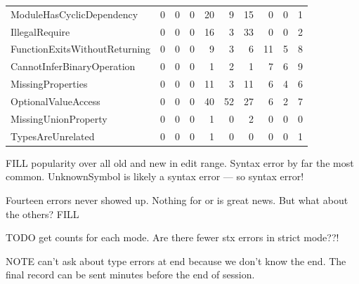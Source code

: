 \documentclass[english,submission,cleveref]{programming}
\begin{document}
\begin{table}[t]
\begin{tabular}{lr@{~}r@{~}rr@{~}r@{~}rr@{~}r@{~}r}
      ModuleHasCyclicDependency & {0} & {0} & {0} & {20} & {9} & {15} & {0} & {0} & {1} \\
      IllegalRequire & {0} & {0} & {0} & {16} & {3} & {33} & {0} & {0} & {2} \\
      FunctionExitsWithoutReturning & {0} & {0} & {0} & {9} & {3} & {6} & {11} & {5} & {8} \\
      CannotInferBinaryOperation & {0} & {0} & {0} & {1} & {2} & {1} & {7} & {6} & {9} \\
      MissingProperties & {0} & {0} & {0} & {11} & {3} & {11} & {6} & {4} & {6} \\
      OptionalValueAccess & {0} & {0} & {0} & {40} & {52} & {27} & {6} & {2} & {7} \\
      MissingUnionProperty & {0} & {0} & {0} & {1} & {0} & {2} & {0} & {0} & {0} \\
      TypesAreUnrelated & {0} & {0} & {0} & {1} & {0} & {0} & {0} & {0} & {1} \\
    \end{tabular}

\end{table}

FILL popularity over all old and new in edit range.
Syntax error by far the most common.
UnknownSymbol is likely a syntax error --- so  syntax error!

Fourteen errors never showed up.
Nothing for  or  is great news.
But what about the others? FILL

TODO get counts for each mode. Are there fewer stx errors in strict mode??!

NOTE can't ask about type errors at end because we don't know
the end.
The final record can be sent minutes before the end of session.
\end{document}

